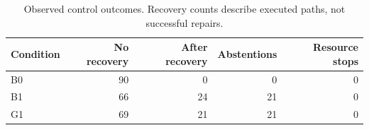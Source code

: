 \begin{table}[!ht]
\centering
\small
\caption[Observed control outcomes]{Observed control outcomes. Recovery counts describe executed paths, not successful repairs.}
\label{tab:execution-control}
\begin{tabular}{lrrrr}
\toprule
Condition & No recovery & After recovery & Abstentions & Resource stops \\
\midrule
B0 & 90 & 0 & 0 & 0 \\
B1 & 66 & 24 & 21 & 0 \\
G1 & 69 & 21 & 21 & 0 \\
\bottomrule
\end{tabular}
\end{table}
